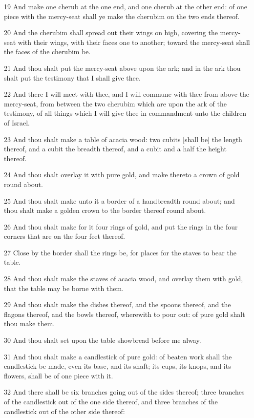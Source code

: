 \par 19 And make one cherub at the one end, and one cherub at the other end: of one piece with the mercy-seat shall ye make the cherubim on the two ends thereof.
\par 20 And the cherubim shall spread out their wings on high, covering the mercy-seat with their wings, with their faces one to another; toward the mercy-seat shall the faces of the cherubim be.
\par 21 And thou shalt put the mercy-seat above upon the ark; and in the ark thou shalt put the testimony that I shall give thee.
\par 22 And there I will meet with thee, and I will commune with thee from above the mercy-seat, from between the two cherubim which are upon the ark of the testimony, of all things which I will give thee in commandment unto the children of Israel.
\par 23 And thou shalt make a table of acacia wood: two cubits [shall be] the length thereof, and a cubit the breadth thereof, and a cubit and a half the height thereof.
\par 24 And thou shalt overlay it with pure gold, and make thereto a crown of gold round about.
\par 25 And thou shalt make unto it a border of a handbreadth round about; and thou shalt make a golden crown to the border thereof round about.
\par 26 And thou shalt make for it four rings of gold, and put the rings in the four corners that are on the four feet thereof.
\par 27 Close by the border shall the rings be, for places for the staves to bear the table.
\par 28 And thou shalt make the staves of acacia wood, and overlay them with gold, that the table may be borne with them.
\par 29 And thou shalt make the dishes thereof, and the spoons thereof, and the flagons thereof, and the bowls thereof, wherewith to pour out: of pure gold shalt thou make them.
\par 30 And thou shalt set upon the table showbread before me alway.
\par 31 And thou shalt make a candlestick of pure gold: of beaten work shall the candlestick be made, even its base, and its shaft; its cups, its knops, and its flowers, shall be of one piece with it.
\par 32 And there shall be six branches going out of the sides thereof; three branches of the candlestick out of the one side thereof, and three branches of the candlestick out of the other side thereof:
